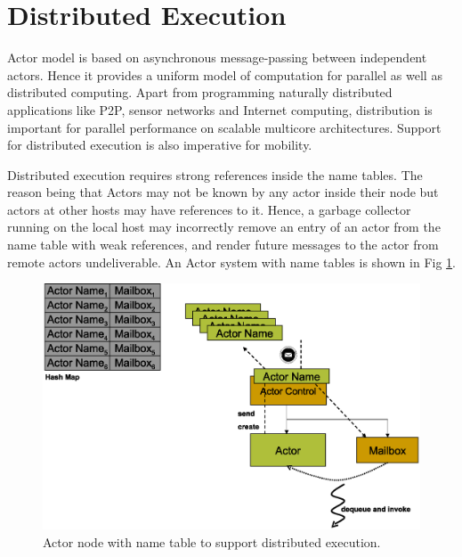 \section{Distributed Execution}
Actor model is based on asynchronous message-passing between independent actors. Hence it provides a uniform model of computation for parallel as well as distributed computing. Apart from programming naturally distributed applications like P2P, sensor networks and Internet computing, distribution is important for parallel performance on scalable multicore architectures. Support for distributed execution is also imperative for mobility.

Distributed execution requires strong references inside the name tables. The reason being that Actors may not be known by any actor inside their node but actors at other hosts may have references to it. Hence, a garbage collector running on the local host may incorrectly remove an entry of an actor from the name table with weak references, and render future messages to the actor from remote actors undeliverable. An Actor system with name tables is shown in Fig \ref{dist_node}.


\begin{figure}%
\centerline
{
\includegraphics[scale=0.4]{images/escape2.eps}
}
\caption{Actor node with name table to support distributed execution.}
\label{dist_node}
\end{figure}





